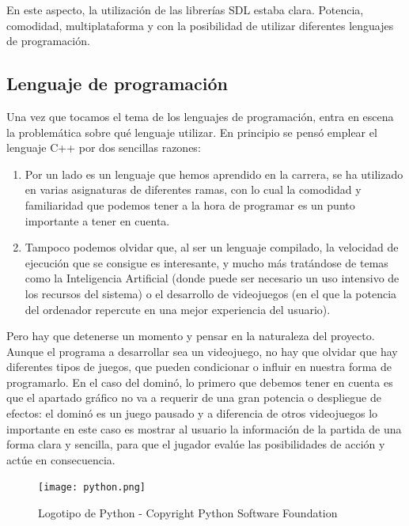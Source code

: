 En este aspecto, la utilización de las librerías SDL estaba clara. Potencia, comodidad, multiplataforma y con la posibilidad
de utilizar diferentes lenguajes de programación.\\

\subsection{Lenguaje de programación}

Una vez que tocamos el tema de los lenguajes de programación, entra en escena la problemática sobre qué lenguaje
utilizar. En principio se pensó emplear el lenguaje C++ por dos sencillas razones:

\begin{enumerate}
    \item Por un lado es un lenguaje que hemos aprendido en la carrera, se ha utilizado en varias asignaturas de
            diferentes ramas, con lo cual la comodidad y familiaridad que podemos tener a la hora de programar
            es un punto importante a tener en cuenta.
    \item Tampoco podemos olvidar que, al ser un lenguaje compilado, la velocidad de ejecución que se consigue
            es interesante, y mucho más tratándose de temas como la Inteligencia Artificial (donde puede ser
            necesario un uso intensivo de los recursos del sistema) o el desarrollo de videojuegos (en el que
            la potencia del ordenador repercute en una mejor experiencia del usuario).
\end{enumerate}

Pero hay que detenerse un momento y pensar en la naturaleza del proyecto. Aunque el programa a desarrollar sea un
videojuego, no hay que olvidar que hay diferentes tipos de juegos, que pueden condicionar o influir en nuestra forma
de programarlo. En el caso del dominó, lo primero que debemos tener en cuenta es que el apartado gráfico no va a
requerir de una gran potencia o despliegue de efectos: el dominó es un juego pausado y a diferencia de otros
videojuegos lo importante en este caso es mostrar al usuario la información de la partida de una forma clara y sencilla,
para que el jugador evalúe las posibilidades de acción y actúe en consecuencia.\\

\begin{figure}[h]
  \begin{center}
    \texttt{[image: python.png]}
  \end{center}
  \caption{Logotipo de Python - Copyright Python Software Foundation}
  \label{logo-python}
\end{figure}

